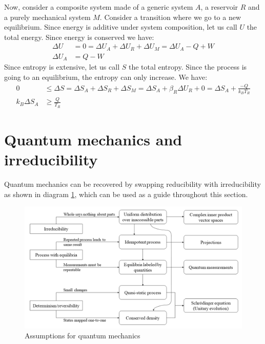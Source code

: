 \documentclass[11pt,letterpaper,fleqn]{memoir} %
\begin{document}
Now, consider a composite system made of a generic system $A$, a reservoir $R$ and a purely mechanical system $M$. Consider a transition where we go to a new equilibrium. Since energy is additive under system composition, let us call $U$ the total energy. Since energy is conserved we have:
\begin{equation}
	\begin{aligned}
		\Delta U &= 0 = \Delta U_A + \Delta U_R +\Delta U_M = \Delta U_A - Q + W \\
		\Delta U_A &= Q - W
	\end{aligned}
\end{equation}
Since entropy is extensive, let us call $S$ the total entropy. Since the process is going to an equilibrium, the entropy can only increase. We have:
\begin{equation}
	\begin{aligned}
		0 &\leq \Delta S = \Delta S_A + \Delta S_R +\Delta S_M = \Delta S_A + \beta_R \Delta U_R + 0 = \Delta S_A + \frac{-Q}{k_B T_R} \\
		k_B \Delta S_A &\geq \frac{Q}{T_R}
	\end{aligned}
\end{equation}

\section{Quantum mechanics and irreducibility}

Quantum mechanics can be recovered by swapping reducibility with irreducibility as shown in diagram \ref{fig_quantum_diagram}, which can be used as a guide throughout this section.

\begin{figure}[h]
	\includegraphics[width=\columnwidth]{images/QuantumDiagram.png}
	\caption{Assumptions for quantum mechanics}\label{fig_quantum_diagram}
\end{figure}
\end{document}
